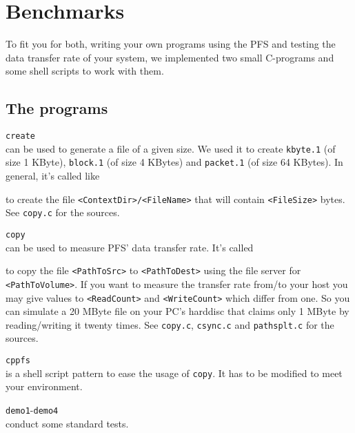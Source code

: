 \chapter{Benchmarks} \label{chap:benchmarks}

To fit you for both, writing your own programs using the PFS and testing the
data transfer rate of your system, we implemented two small C-programs and
some shell scripts to work with them. 

\section{The programs}

\begin{description}

  \item {\tt create} \\
        can be used to generate a file of a given size. We used it to create
        {\tt kbyte.1} (of size 1 KByte), {\tt block.1} (of size 4 KBytes) and
        {\tt packet.1} (of size 64 KBytes). In general, it's called like


        to create the file {\tt <ContextDir>/<FileName>} that will contain
        {\tt <FileSize>} bytes. See {\tt copy.c} for the sources.

  \item {\tt copy} \\
        can be used to measure PFS' data transfer rate. It's called


        to copy the file {\tt <PathToSrc>} to {\tt <PathToDest>} using the
        file server for {\tt <Path\-To\-Volume>}. If you want to measure the
        transfer rate from/to your host you may give values to
        {\tt <ReadCount>} and {\tt <WriteCount>} which differ from one. So you
        can simulate a 20 MByte file on your PC's harddisc that claims only 1
        MByte by reading\slash writing it twenty times. See {\tt copy.c},
        {\tt csync.c} and {\tt pathsplt.c} for the sources.

  \item {\tt cppfs} \\
        is a shell script pattern to ease the usage of {\tt copy}. It has to
        be modified to meet your environment.

  \item {\tt demo1}-{\tt demo4} \\
        conduct some standard tests.

\end{description}
